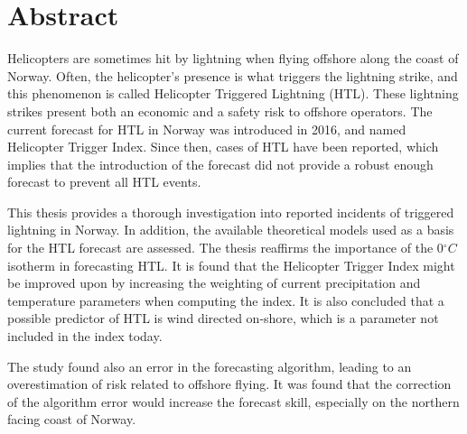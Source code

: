\chapter*{Abstract}

Helicopters are sometimes hit by lightning when flying offshore along the coast of Norway. Often, the helicopter's presence is what triggers the lightning strike, and this phenomenon is called Helicopter Triggered Lightning (HTL). These lightning strikes present both an economic and a safety risk to offshore operators. The current forecast for HTL in Norway was introduced in 2016, and named Helicopter Trigger Index. Since then, cases of HTL have been reported, which implies that the introduction of the forecast did not provide a robust enough forecast to prevent all HTL events. 

This thesis provides a thorough investigation into reported incidents of triggered lightning in Norway. In addition, the available theoretical models used as a basis for the HTL forecast are assessed.  The thesis reaffirms the importance of the 0$^{\circ}C$ isotherm in forecasting HTL. It is found that the Helicopter Trigger Index might be improved upon by increasing the weighting of current precipitation and temperature parameters when computing the index. It is also concluded that a possible predictor of HTL is wind directed on-shore, which is a parameter not included in the index today.

The study found also an error in the forecasting algorithm, leading to an overestimation of risk related to offshore flying. It was found that the correction of the algorithm error would increase the forecast skill, especially on the northern facing coast of Norway.